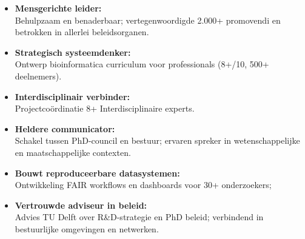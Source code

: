 \documentclass[a4paper,10pt]{article}
\begin{document}
{\begin{adjustbox}{valign=t}
\begin{minipage}[t]{0.3\textwidth}
\begin{itemize}[leftmargin=1em, itemindent=0em]
  \setlength{\itemsep}{0.0em}
  \item \textbf{Mensgerichte leider:}\\ 
    Behulpzaam en benaderbaar;  
    vertegenwoordigde 2.000+ promovendi en betrokken in allerlei beleidsorganen.
  \item \textbf{Strategisch systeemdenker:} \\ 
    Ontwerp bioinformatica curriculum voor professionals (8+/10, 500+ deelnemers).
  \item \textbf{Interdisciplinair verbinder:} \\ 
    Projectcoördinatie 8+ Interdisciplinaire experts. 
  \item \textbf{Heldere communicator:} \\ 
    Schakel tussen PhD-council en bestuur; 
    ervaren spreker in wetenschappelijke en maatschappelijke contexten.
  \item \textbf{Bouwt reproduceerbare datasystemen:} \\ 
    Ontwikkeling FAIR workflows en dashboards voor 30+ onderzoekers; 
  \item \textbf{Vertrouwde adviseur in beleid:} \\ 
    Advies TU Delft over R\&D-strategie en PhD beleid;
    verbindend in bestuurlijke omgevingen en netwerken.
\end{itemize}


\end{minipage}%
\end{adjustbox}%
\hfill%


\begin{adjustbox}{valign=t}
\hfill%
\begin{minipage}[t]{0.05\textwidth}
\MyVerticalRule
\end{minipage}%
\end{adjustbox}

\begin{adjustbox}{valign=t}
\hfill%
\begin{minipage}[t]{0.6\textwidth}



\end{minipage}
\end{adjustbox}}
\end{document}
